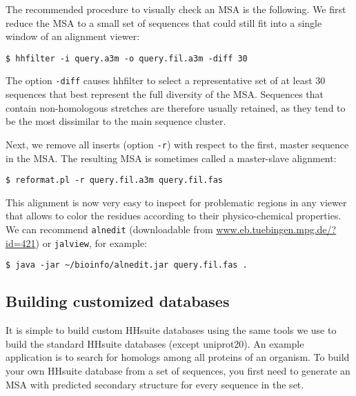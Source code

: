 \documentclass[11pt,a4paper]{article}
\begin{document}
The recommended procedure to visually check an MSA is the following. We first reduce the MSA to a small set of sequences that could still fit into a single window of an alignment viewer:
\begin{verbatim}
$ hhfilter -i query.a3m -o query.fil.a3m -diff 30
\end{verbatim}
The option \verb`-diff` causes hhfilter to select a representative set of at least 30 sequences that best represent the full diversity of the MSA. Sequences that contain non-homologous stretches are therefore usually retained, as they tend to be the most dissimilar to the main sequence cluster. 

Next, we remove all inserts (option \verb`-r`) with respect to the first, master sequence in the MSA. The resulting MSA is sometimes called a master-slave alignment:
\begin{verbatim}
$ reformat.pl -r query.fil.a3m query.fil.fas
\end{verbatim}

This alignment is now very easy to inspect for problematic regions in any viewer that allows to color the residues according to their physico-chemical properties. We can recommend \verb`alnedit` (downloadable from \url{www.eb.tuebingen.mpg.de/?id=421}) or \verb`jalview`, for example:
\begin{verbatim}
$ java -jar ~/bioinfo/alnedit.jar query.fil.fas .
\end{verbatim}

\subsection{Building customized databases} \label{building_dbs}

It is simple to build custom HHsuite databases using the same tools we use to build the standard HHsuite databases (except uniprot20). An example application is to search for homologs among all proteins of an organism. To build your own HHsuite database from a set of sequences, you first need to generate an MSA with predicted secondary structure for every sequence in the set.
\end{document}
